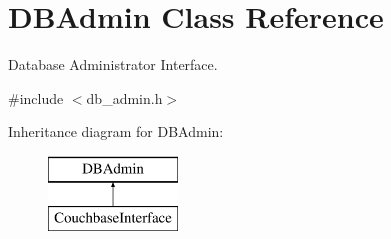 \hypertarget{classDBAdmin}{\section{D\-B\-Admin Class Reference}
\label{classDBAdmin}
}


Database Administrator Interface.  




{\ttfamily \#include $<$db\-\_\-admin.\-h$>$}

Inheritance diagram for D\-B\-Admin\-:\begin{figure}[H]
\begin{center}
\leavevmode
\includegraphics[height=2.000000cm]{classDBAdmin}
\end{center}
\end{figure}
